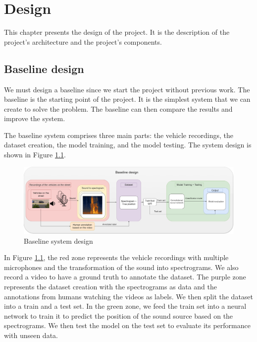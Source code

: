 
\chapter{Design}
\label{ch:methodology}

This chapter presents the design of the project. It is the description of the project's architecture and the project's components.

\section{Baseline design}
\label{sec:baseline_design}

We must design a baseline since we start the project without previous work. The baseline is the starting point of the project. It is the simplest system that we can create to solve the problem. The baseline can then compare the results and improve the system.

The baseline system comprises three main parts: the vehicle recordings, the dataset creation, the model training, and the model testing. The system design is shown in Figure \ref{fig:baseline_system_design}.

\begin{figure}[H]
    \centering
    \includegraphics[width=1\textwidth]{../Images/baseline_system_design.drawio.png}
    \caption{Baseline system design}
    \label{fig:baseline_system_design}
\end{figure}

In Figure \ref{fig:baseline_system_design}, the red zone represents the vehicle recordings with multiple microphones and the transformation of the sound into spectrograms. We also record a video to have a ground truth to annotate the dataset. The purple zone represents the dataset creation with the spectrograms as data and the annotations from humans watching the videos as labels. We then split the dataset into a train and a test set. In the green zone, we feed the train set into a neural network to train it to predict the position of the sound source based on the spectrograms. We then test the model on the test set to evaluate its performance with unseen data.

